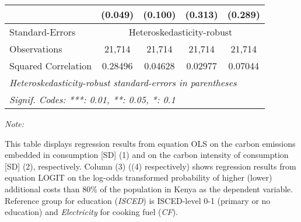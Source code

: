\begin{table}[htbp!]
\begin{adjustbox}{width = 1\textwidth, max height = 0.95\textheight, center}
\begin{threeparttable}[b]
\begin{tabular}{lcccc}
                                 & (0.049)            & (0.100)            & (0.313)        & (0.289)\\   
            \midrule 
            Standard-Errors & \multicolumn{4}{c}{Heteroskedasticity-robust} \\ 
            Observations         & 21,714             & 21,714             & 21,714         & 21,714\\  
            Squared Correlation  & 0.28496            & 0.04628            & 0.02977        & 0.07044\\  
            \midrule \midrule
            \multicolumn{5}{l}{\emph{Heteroskedasticity-robust standard-errors in parentheses}}\\
            \multicolumn{5}{l}{\emph{Signif. Codes: ***: 0.01, **: 0.05, *: 0.1}}\\
         \end{tabular}
         
         \begin{tablenotes}\item \medskip \textit{Note:}
            \item This table displays regression results from equation OLS on the carbon emissions embedded in consumption [SD] (1) and on the carbon intensity of consumption [SD] (2), respectively. 
                                      Column (3) ((4) respectively) shows regression results from equation LOGIT on the log-odds transformed probability of higher (lower) additional costs than 80\% of the population in Kenya as the dependent variable. Reference group for education (\textit{ISCED}) is ISCED-level 0-1 (primary or no education) and \textit{Electricity} for cooking fuel (\textit{CF}).
         \end{tablenotes}
      \end{threeparttable}
   \end{adjustbox}
\end{table}



